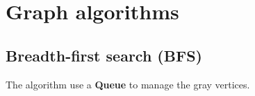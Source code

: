 \chapter{Graph algorithms}
\section{Breadth-first search (BFS)}
The algorithm use a \textbf{Queue} to manage the gray vertices. 